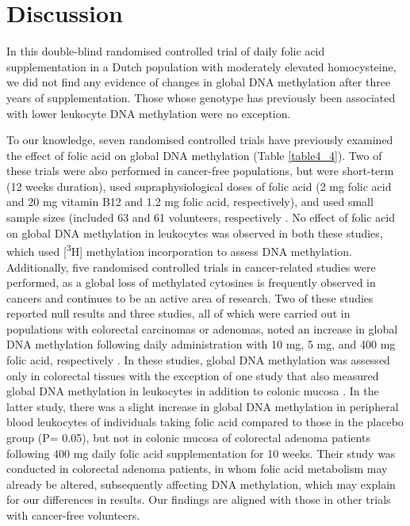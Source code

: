\section{Discussion} %
\noindent In this double-blind randomised controlled trial of daily folic acid supplementation in a Dutch population with moderately elevated homocysteine, we did not find any evidence of changes in global DNA methylation after three years of supplementation. Those whose genotype has previously been associated with lower leukocyte DNA methylation were no exception. 
 
\noindent To our knowledge, seven randomised controlled trials have previously examined the effect of folic acid on global DNA methylation (Table \ref{table4_4}). Two of these trials were also performed in cancer-free populations, but were short-term (12 weeks duration), used supraphysiological doses of folic acid (2 mg folic acid and 20 mg vitamin B12 and 1.2 mg folic acid, respectively), and used small sample sizes (included 63 and 61 volunteers, respectively \cite{c434,c435}. No effect of folic acid on global DNA methylation in leukocytes was observed in both these studies, which used [\textsuperscript{3}H] methylation incorporation to assess DNA methylation. Additionally, five randomised controlled trials in cancer-related studies were performed, as a global loss of methylated cytosines is frequently observed in cancers \cite{c436} and continues to be an active area of research. Two of these studies reported null results \cite{c437,c438} and three studies, all of which were carried out in populations with colorectal carcinomas or adenomas, noted an increase in global DNA methylation following daily administration with 10 mg, 5 mg, and 400 mg folic acid, respectively \cite{c439,c440,c441}. In these studies, global DNA methylation was assessed only in colorectal tissues with the exception of one study that also measured global DNA methylation in leukocytes in addition to colonic mucosa \cite{c441}. In the latter study, there was a slight increase in global DNA methylation in peripheral blood leukocytes of individuals taking folic acid compared to those in the placebo group (P= 0.05), but not in colonic mucosa of colorectal adenoma patients following 400 mg daily folic acid supplementation for 10 weeks. Their study was conducted in colorectal adenoma patients, in whom folic acid metabolism may already be altered, subsequently affecting DNA methylation, which may explain for our differences in results. Our findings are aligned with those in other trials with cancer-free volunteers.

